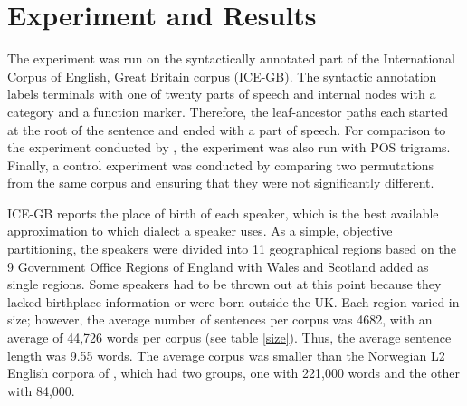 \documentclass[11pt,letterpaper]{article}
\begin{document}

\section{Experiment and Results}

The experiment was run on the syntactically annotated part of the
International Corpus of English, Great Britain corpus (ICE-GB).
The syntactic annotation labels terminals with one of twenty parts of
speech and internal nodes with a category and a function
marker. Therefore, the leaf-ancestor paths each started at the root of
the sentence and ended with a part of speech.
For comparison to the experiment conducted by , the
experiment was also run with POS trigrams. Finally, a control
experiment was conducted by comparing two permutations from the same
corpus and ensuring that they were not significantly different.

ICE-GB reports the place of birth of each speaker, which is the best
available approximation to which dialect a speaker uses. As a simple,
objective partitioning, the speakers were divided into 11 geographical
regions based on the 9 Government Office Regions of England with Wales
and Scotland added as single regions. Some speakers had to be thrown
out at this point because they lacked birthplace information or were
born outside the UK. Each region varied in size; however, the average
number of sentences per corpus was 4682, with an average of 44,726
words per corpus (see table \ref{size}).  Thus, the average
sentence length was 9.55 words.  The average corpus was smaller than
the Norwegian L2 English corpora of , which had two
groups, one with 221,000 words and the other with 84,000.
\end{document}
